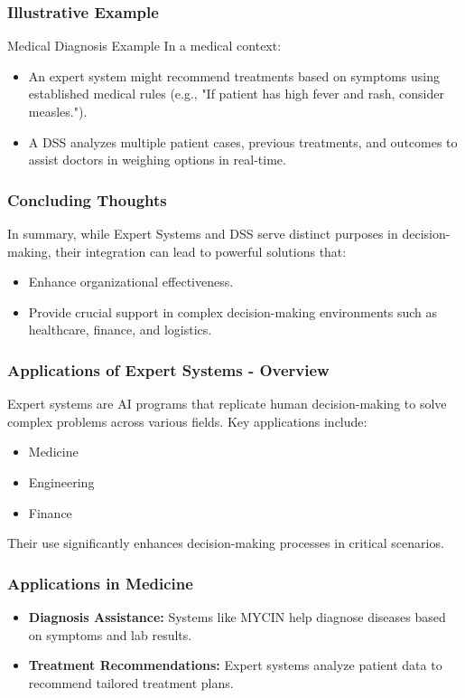 \documentclass[aspectratio=169]{beamer}
\begin{document}
\begin{frame}[fragile]
    \frametitle{Illustrative Example}
    \begin{block}{Medical Diagnosis Example}
        In a medical context:
        \begin{itemize}
            \item An expert system might recommend treatments based on symptoms using established medical rules (e.g., "If patient has high fever and rash, consider measles.").
            \item A DSS analyzes multiple patient cases, previous treatments, and outcomes to assist doctors in weighing options in real-time.
        \end{itemize}
    \end{block}
\end{frame}

\begin{frame}[fragile]
    \frametitle{Concluding Thoughts}
    In summary, while Expert Systems and DSS serve distinct purposes in decision-making, their integration can lead to powerful solutions that:
    \begin{itemize}
        \item Enhance organizational effectiveness.
        \item Provide crucial support in complex decision-making environments such as healthcare, finance, and logistics.
    \end{itemize}
\end{frame}

\begin{frame}[fragile]
    \frametitle{Applications of Expert Systems - Overview}
    Expert systems are AI programs that replicate human decision-making to solve complex problems across various fields. Key applications include:
    \begin{itemize}
        \item Medicine
        \item Engineering
        \item Finance
    \end{itemize}
    Their use significantly enhances decision-making processes in critical scenarios.
\end{frame}

\begin{frame}[fragile]
    \frametitle{Applications in Medicine}
    \begin{itemize}
        \item \textbf{Diagnosis Assistance:} 
        Systems like MYCIN help diagnose diseases based on symptoms and lab results.
        \item \textbf{Treatment Recommendations:} 
        Expert systems analyze patient data to recommend tailored treatment plans.
    \end{itemize}
\end{frame}
\end{document}
